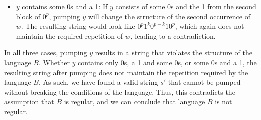 \documentclass[12pt]{article}
\begin{document}
\begin{itemize}
\begin{itemize}
    \item $y$ contains some 0s and a 1: If $y$ consists of some 0s and the 1 from the second block of $0^p$, pumping $y$ will change the structure of the second occurrence of $w$. The resulting string would look like $0^p1^k0^{p-k}10^p$, which again does not maintain the required repetition of $w$, leading to a contradiction.
\end{itemize}

In all three cases, pumping $y$ results in a string that violates the structure of the language $B$. Whether $y$ contains only 0s, a 1 and some 0s, or some 0s and a 1, the resulting string after pumping does not maintain the repetition required by the language $B$. As such, we have found a valid string $s'$ that cannot be pumped without breaking the conditions of the language. Thus, this contradicts the assumption that $B$ is regular, and we can conclude that language $B$ is not regular.
\end{itemize}

\vspace{12pt}
\end{document}
